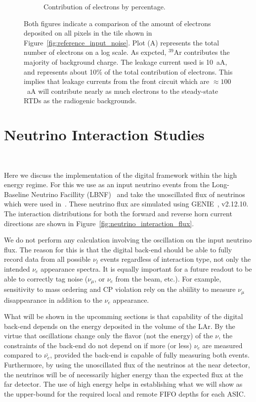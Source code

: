 \begin{figure}
\begin{subfigure}{.5\textwidth}
  \caption{Contribution of electrons by percentage.}
\end{subfigure}
\caption{Both figures indicate a comparison of the amount of electrons deposited on all pixels in the tile shown in Figure~\ref{fig:reference_input_noise}.
Plot (A) represents the total number of electrons on a log scale.
As expcted, $^{39}$Ar contributes the majority of background charge.
The leakage current used is 10~\unit{aA}, and represents about 10\% of the total contribution of electrons.
This implies that leakage currents from the front circuit which are $\approx 100$~\unit{aA} will contribute nearly as much electrons to the steady-state RTDs as the radiogenic backgrounds.
}
\label{fig:compare_electron_contribution}
\end{figure}

\section{Neutrino Interaction Studies}~\label{sec:neutrino_studies}

Here we discuss the implementation of the digital framework within the high energy regime.
For this we use as an input neutrino events from the Long-Baseline Neutrino Facillity (LBNF)~\citep{dune_cdr_2016_arxiv} and take the unoscillated flux of neutrinos which were used in~\citep{dune_2021_near_detector_cdr}.
These neutrino flux are simulated using GENIE~\citep{Andreopoulos:2009rq}, v2.12.10.
The interaction distributions for both the forward and reverse horn current directions are shown in Figure~\ref{fig:neutrino_interaction_flux}.

We do not perform any calculation involving the oscillation on the input neutrino flux.
The reason for this is that the digital back-end should be able to fully record data from all possible $\nu_{l}$ events regardless of interaction type, not only the intended $\nu_{e}$ appearance spectra.
It is equally important for a future readout to be able to correctly tag noise ($\nu_{\mu}$, or $\nu_{e}$ from the beam, etc.).
For example, sensitivity to mass ordering and CP violation rely on the abiility to measure $\nu_{\mu}$ disappearance in addition to the $\nu_{e}$ appearance.

What will be shown in the upcomming sections is that capability of the digital back-end depends on the energy deposited in the volume of the LAr.
By the virtue that oscillations change only the flavor (not the energy) of the $\nu$, the constraints of the back-end do not depend on if more (or less) $\nu_{e}$ are measured compared to $\bar{\nu_{e}}$, provided the back-end is capable of fully measuring both events.
Furthermore, by using the unoscillated flux of the neutrinos at the near detector, the neutrinos will be of necessarily higher energy than the expected flux at the far detector.
The use of high energy helps in establishing what we will show as the upper-bound for the required local and remote FIFO depths for each ASIC.

